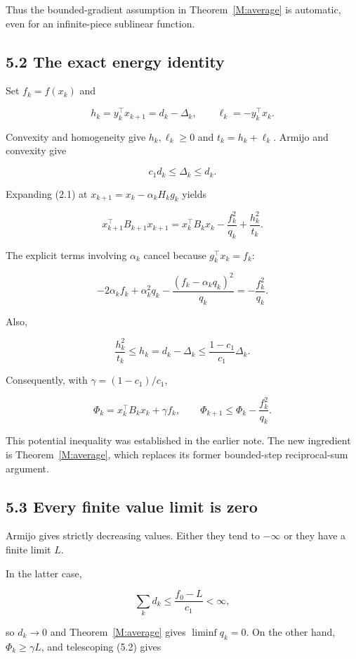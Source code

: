 Thus the bounded-gradient assumption in Theorem~\ref{M:average} is automatic, even for
an infinite-piece sublinear function.

\subsection{5.2 The exact energy
identity}\label{H:the-exact-energy-identity}

Set \(f_k=f(x_k)\) and

\[
h_k=y_k^\top x_{k+1}=d_k-\Delta_k,\qquad
\ell_k=-y_k^\top x_k.
\]

Convexity and homogeneity give \(h_k,\ell_k\ge0\) and
\(t_k=h_k+\ell_k\). Armijo and convexity give

\[
c_1d_k\le\Delta_k\le d_k.
\]

Expanding (2.1) at \(x_{k+1}=x_k-\alpha_kH_kg_k\) yields

\[
\boxed{
x_{k+1}^\top B_{k+1}x_{k+1}
=x_k^\top B_kx_k-\frac{f_k^2}{q_k}+\frac{h_k^2}{t_k}.
}
\tag{H.5.1}
\]

The explicit terms involving \(\alpha_k\) cancel because
\(g_k^\top x_k=f_k\):

\[
-2\alpha_k f_k+\alpha_k^2q_k
-\frac{(f_k-\alpha_kq_k)^2}{q_k}
=-\frac{f_k^2}{q_k}.
\]

Also,

\[
\frac{h_k^2}{t_k}\le h_k=d_k-\Delta_k
\le\frac{1-c_1}{c_1}\Delta_k.
\]

Consequently, with \(\gamma=(1-c_1)/c_1\),

\[
\Phi_k=x_k^\top B_kx_k+\gamma f_k,
\qquad
\boxed{\Phi_{k+1}\le\Phi_k-\frac{f_k^2}{q_k}.}
\tag{H.5.2}
\]

This potential inequality was established in the earlier note. The new
ingredient is Theorem~\ref{M:average}, which replaces its former bounded-step
reciprocal-sum argument.

\subsection{5.3 Every finite value limit is
zero}\label{H:every-finite-value-limit-is-zero}

Armijo gives strictly decreasing values. Either they tend to \(-\infty\)
or they have a finite limit \(L\).

In the latter case,

\[
\sum_k d_k\le\frac{f_0-L}{c_1}<\infty,
\]

so \(d_k\to0\) and Theorem~\ref{M:average} gives \(\liminf q_k=0\). On the other hand,
\(\Phi_k\ge\gamma L\), and telescoping (5.2) gives

